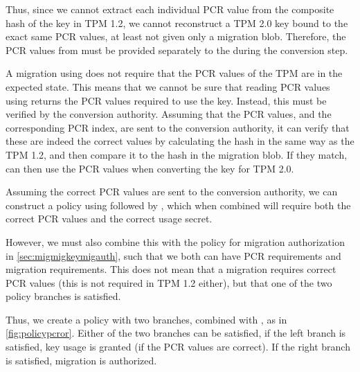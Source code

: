{Thus, since we cannot extract each individual PCR value from the composite hash of the key in TPM 1.2, we cannot reconstruct a TPM 2.0 key bound to the exact same PCR values, at least not given only a migration blob.
Therefore, the PCR values from \tpms{} must be provided separately to the \ca{} during the conversion step.

A migration using  does not require that the PCR values of the TPM are in the expected state. This means that we cannot be sure that reading PCR values using  returns the PCR values required to use the key. Instead, this must be verified by the conversion authority. Assuming that the PCR values, and the corresponding PCR index, are sent to the conversion authority, it can verify that these are indeed the correct values by calculating the hash in the same way as the TPM 1.2, and then compare it to the hash in the migration blob. If they match, \ca{} can then use the PCR values when converting the key for TPM 2.0.

Assuming the correct PCR values are sent to the conversion authority, we can construct a policy using  followed by , which when combined will require both the correct PCR values and the correct usage secret.

However, we must also combine this with the policy for migration authorization in \autoref{sec:migmigkeymigauth}, such that we both can have PCR requirements and migration requirements. This does not mean that a migration requires correct PCR values (this is not required in TPM 1.2 either), but that one of the two policy branches is satisfied.

Thus, we create a policy with two branches, combined with , as in \autoref{fig:policypcror}. Either of the two branches can be satisfied, if the left branch is satisfied, key usage is granted (if the PCR values are correct). If the right branch is satisfied, migration is authorized.

\begin{figure}[htbp]
	\centering
%	
%	
%	
%	
	

\end{figure}}
